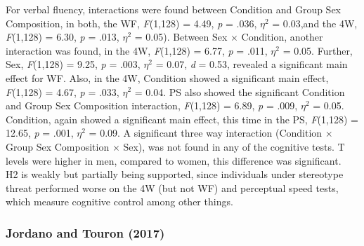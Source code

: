 \documentclass[
  stu,floatsintext]{apa7}
\begin{document}
For verbal fluency, interactions were found between Condition and Group Sex Composition, in both, the WF, \emph{F}(1,128) = 4.49, \emph{p} = .036, \(\eta^{2}\) = 0.03,and the 4W, \emph{F}(1,128) = 6.30, \emph{p} = .013, \(\eta^{2}\) = 0.05).
Between Sex \(\times\) Condition, another interaction was found, in the 4W, \emph{F}(1,128) = 6.77, \emph{p} = .011, \(\eta^{2}\) = 0.05.
Further, Sex, \emph{F}(1,128) = 9.25, \emph{p} = .003, \(\eta^{2}\) = 0.07, \emph{d} = 0.53, revealed a significant main effect for WF.
Also, in the 4W, Condition showed a significant main effect, \emph{F}(1,128) = 4.67, \emph{p} = .033, \(\eta^{2}\) = 0.04.
PS also showed the significant Condition and Group Sex Composition interaction, \emph{F}(1,128) = 6.89, \emph{p} = .009, \(\eta^{2}\) = 0.05.
Condition, again showed a significant main effect, this time in the PS, \emph{F}(1,128) = 12.65, \emph{p} = .001, \(\eta^{2}\) = 0.09.
A significant three way interaction (Condition \(\times\) Group Sex Composition \(\times\) Sex), was not found in any of the cognitive tests.
T levels were higher in men, compared to women, this difference was significant.\\
H2 is weakly but partially being supported, since individuals under stereotype threat performed worse on the 4W (but not WF) and perceptual speed tests, which measure cognitive control among other things.

\subsubsection{Jordano and Touron (2017)}\label{jordanoprimingperformancerelatedconcerns2017}
\end{document}
